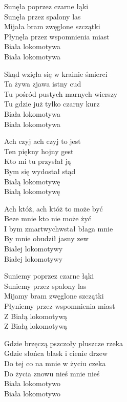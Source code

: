 \begin{text}
    Sunęła poprzez czarne łąki\\
    Sunęła przez spalony las\\
    Mijała bram zwęglone szczątki\\
    Płynęła przez wspomnienia miast\\
    Biała lokomotywa\\
    Biała lokomotywa

    Skąd wzięła się w krainie śmierci\\
    Ta żywa zjawa istny cud\\
    Tu pośród pustych marnych wierszy\\
    Tu gdzie już tylko czarny kurz\\
    Biała lokomotywa\\
    Biała lokomotywa

    Ach czyj ach czyj to jest\\
    Ten piękny hojny gest\\
    Kto mi tu przysłał ją\\
    Bym się wydostał stąd\\
    Białą lokomotywę\\
    Białą lokomotywę

    Ach któż, ach któż to może być\\
    Beze mnie kto nie może żyć\\
    I bym zmartwychwstał błaga mnie\\
    By mnie obudził jasny zew\\
    Białej lokomotywy\\
    Białej lokomotywy

    Suniemy poprzez czarne łąki\\
    Suniemy przez spalony las\\
    Mijamy bram zwęglone szczątki\\
    Płyniemy przez wspomnienia miast\\
    Z Białą lokomotywą\\
    Z Białą lokomotywą

    Gdzie brzęczą pszczoły pluszcze rzeka\\
    Gdzie słońca blask i cienie drzew\\
    Do tej co na mnie w życiu czeka\\
    Do życia znowu nieś mnie nieś\\
    Biała lokomotywo\\
    Biała lokomotywo
\end{text}
